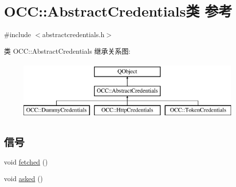\hypertarget{class_o_c_c_1_1_abstract_credentials}{}\section{O\+CC\+:\+:Abstract\+Credentials类 参考}
\label{class_o_c_c_1_1_abstract_credentials}


{\ttfamily \#include $<$abstractcredentials.\+h$>$}

类 O\+CC\+:\+:Abstract\+Credentials 继承关系图\+:\begin{figure}[H]
\begin{center}
\leavevmode
\includegraphics[height=3.000000cm]{class_o_c_c_1_1_abstract_credentials}
\end{center}
\end{figure}
\subsection*{信号}
\begin{DoxyCompactItemize}
\item 
void \hyperlink{class_o_c_c_1_1_abstract_credentials_aaaebacf10df888ed98e4b6974fd3cfaa}{fetched} ()
\item 
void \hyperlink{class_o_c_c_1_1_abstract_credentials_a0ea872247ddb71564cc0ea2209e58763}{asked} ()
\end{DoxyCompactItemize}
